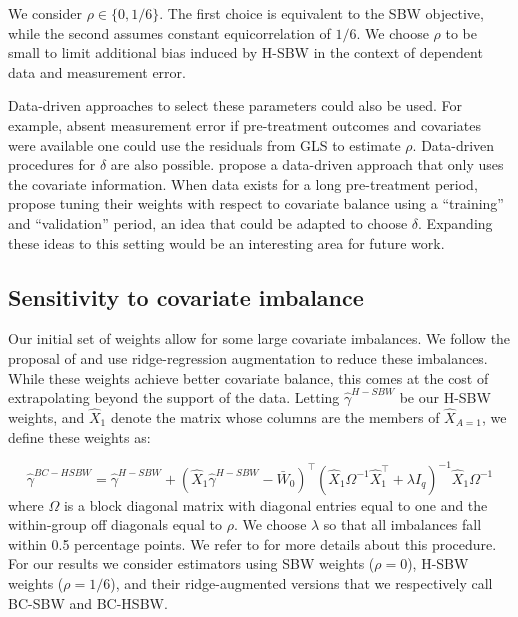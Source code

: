 \documentclass[aoas]{imsart}
\theoremstyle{plain}
\theoremstyle{remark}
\begin{document}
We consider $\rho \in \{0, 1/6\}$. The first choice is equivalent to the SBW objective, while the second assumes constant equicorrelation of $1/6$. We choose $\rho$ to be small to limit additional bias induced by H-SBW in the context of dependent data and measurement error.

Data-driven approaches to select these parameters could also be used. For example, absent measurement error if pre-treatment outcomes and covariates were available one could use the residuals from GLS to estimate $\rho$. Data-driven procedures for $\delta$ are also possible. \citet{wang2020minimal} propose a data-driven approach that only uses the covariate information. When data exists for a long pre-treatment period, \citet{abadie2015comparative} propose tuning their weights with respect to covariate balance using a ``training'' and ``validation'' period, an idea that could be adapted to choose $\delta$. Expanding these ideas to this setting would be an interesting area for future work.

\subsection{Sensitivity to covariate imbalance}

Our initial set of weights allow for some large covariate imbalances. We follow the proposal of \citet{ben2021augmented} and use ridge-regression augmentation to reduce these imbalances. While these weights achieve better covariate balance, this comes at the cost of extrapolating beyond the support of the data. Letting $\hat{\gamma}^{H-SBW}$ be our H-SBW weights, and $\hat{X}_1$ denote the matrix whose columns are the members of $\hat{X}_{A=1}$, we define these weights as:

\begin{equation}
\hat{\gamma}^{BC-HSBW} = \hat{\gamma}^{H-SBW} + (\hat{X}_1\hat{\gamma}^{H-SBW} - \bar{W}_0)^\top(\hat{X}_1\Omega^{-1}\hat{X}_1^\top + \lambda I_q)^{-1}\hat{X}_1\Omega^{-1}
\end{equation}
%
where $\Omega$ is a block diagonal matrix with diagonal entries equal to one and the within-group off diagonals equal to $\rho$. We choose $\lambda$ so that all imbalances fall within 0.5 percentage points. We refer to \citet{ben2021augmented} for more details about this procedure. For our results we consider estimators using SBW weights ($\rho = 0$), H-SBW weights ($\rho = 1/6$), and their ridge-augmented versions that we respectively call BC-SBW and BC-HSBW.
\end{document}
